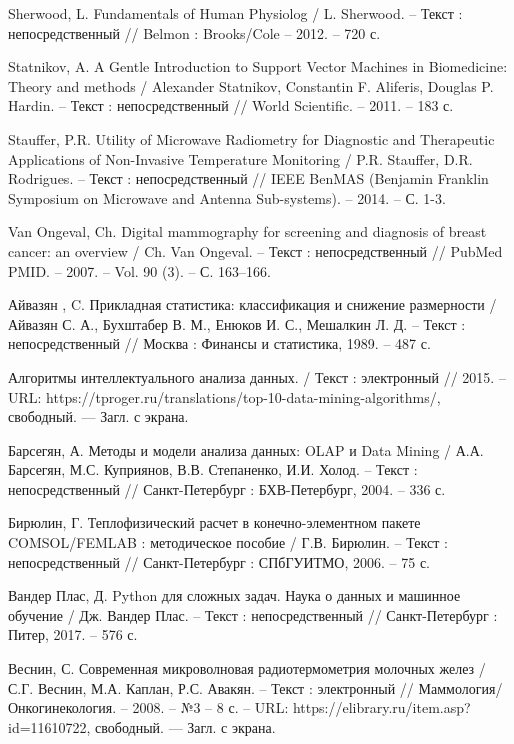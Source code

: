 \begin{thebibliography}{3}
	 Sherwood, L. Fundamentals of Human Physiolog / L. Sherwood. -- Текст : непосредственный // Belmon : Brooks/Cole -- 2012. -- 720 с.
	
	 Statnikov, A. A Gentle Introduction to Support Vector Machines in Biomedicine: Theory and methods / Alexander Statnikov, Constantin F. Aliferis, Douglas P. Hardin. -- Текст : непосредственный // World Scientific. -- 2011. -- 183 с.
	
	 Stauffer, P.R. Utility of Microwave Radiometry for Diagnostic and Therapeutic Applications of Non-Invasive Temperature Monitoring / P.R. Stauffer, D.R. Rodrigues. -- Текст : непосредственный // IEEE BenMAS (Benjamin Franklin Symposium on Microwave and Antenna Sub-systems). -- 2014. -- С. 1-3.
	
	 Van Ongeval, Ch. Digital mammography for screening and diagnosis of breast cancer:
	an overview / Ch. Van Ongeval. -- Текст : непосредственный // PubMed PMID. -- 2007. -- Vol. 90 (3). -- С. 163–166.
	
	 Айвазян , C. Прикладная статистика: классификация и снижение размерности / Айвазян С. А., Бухштабер В. М., Енюков И. С., Мешалкин Л. Д. -- Текст : непосредственный // Москва : Финансы и статистика, 1989. -- 487 с.
	
	 Алгоритмы интеллектуального анализа данных. / Текст : электронный // 2015. -- URL: https://tproger.ru/translations/top-10-data-mining-algorithms/, свободный. — Загл. с экрана.
	
	 Барсегян, А. Методы и модели анализа данных: OLAP и Data Mining / А.А. Барсегян, М.С. Куприянов, В.В. Степаненко, И.И. Холод. -- Текст : непосредственный // Санкт-Петербург : 
	БХВ-Петербург, 2004. -- 336 с.
	
	 Бирюлин, Г. Теплофизический расчет в конечно-элементном пакете COMSOL/FEMLAB :  методическое пособие / Г.В. Бирюлин. -- Текст : непосредственный // Санкт-Петербург : СПбГУИТМО, 2006. -- 75 с.
	
	 Вандер Плас, Д. Python для сложных задач. Наука о данных и машинное обучение / Дж. Вандер Плас. -- Текст : непосредственный // Санкт-Петербург : Питер, 2017. -- 576 с.
	
	 Веснин, С. Современная микроволновая радиотермометрия молочных желез / С.Г. Веснин, М.А. Каплан, Р.С. Авакян. -- Текст : электронный // Маммология/Онкогинекология. -- 2008. -- №3 -- 8 с. -- URL: https://elibrary.ru/item.asp?id=11610722, свободный. — Загл. с экрана.
	

\end{thebibliography}
